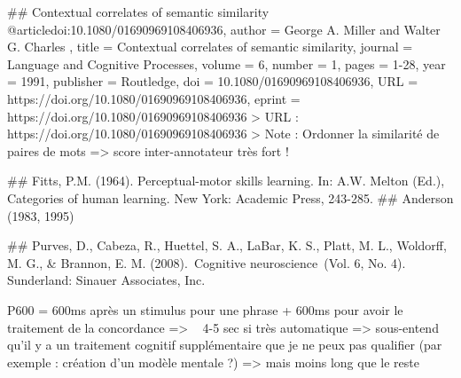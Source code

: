 	
	## Contextual correlates of semantic similarity
	@article{doi:10.1080/01690969108406936,
		author = { George A.   Miller  and  Walter G.   Charles },
		title = {Contextual correlates of semantic similarity},
		journal = {Language and Cognitive Processes},
		volume = {6},
		number = {1},
		pages = {1-28},
		year  = {1991},
		publisher = {Routledge},
		doi = {10.1080/01690969108406936},
		URL = {https://doi.org/10.1080/01690969108406936},
		eprint = {https://doi.org/10.1080/01690969108406936}
	}
	> URL : https://doi.org/10.1080/01690969108406936
	> Note : Ordonner la similarité de paires de mots => score inter-annotateur très fort !
	
	## Fitts, P.M. (1964). Perceptual-motor skills learning. In: A.W. Melton (Ed.), Categories of human learning. New York: Academic Press, 243-285.
	## Anderson (1983, 1995)
	
	
	## 
		Purves, D., Cabeza, R., Huettel, S. A., LaBar, K. S., Platt, M. L., Woldorff, M. G., & Brannon, E. M. (2008). Cognitive neuroscience (Vol. 6, No. 4). Sunderland: Sinauer Associates, Inc. 
		
		P600 = 600ms après un stimulus pour une phrase
		+ 600ms pour avoir le traitement de la concordance
		=> ~ 4-5 sec si très automatique
		=> sous-entend qu'il y a un traitement cognitif supplémentaire que je ne peux pas qualifier (par exemple : création d'un modèle mentale ?)
		=> mais moins long que le reste